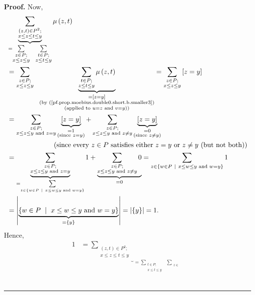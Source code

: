 \documentclass[numbers=enddot,12pt,final,onecolumn,notitlepage]{scrartcl}%
\theoremstyle{definition}
\newenvironment{proof}[1][Proof]{\noindent\textbf{#1.} }{\ \rule{0.5em}{0.5em}}
\newenvironment{vershort}{}{}
\let\sumnonlimits\sum
\renewcommand{\sum}{\sumnonlimits\limits}
\begin{document}
\begin{vershort}
\begin{proof}
Now,%
\begin{align*}
&  \underbrace{\sum_{\substack{\left(  z,t\right)  \in P^{2};\\x\leq z\leq
t\leq y}}}_{=\sum_{\substack{z\in P;\\x\leq z\leq y}}\ \ \sum_{\substack{t\in
P;\\z\leq t\leq y}}}\mu\left(  z,t\right) \\
&  =\sum_{\substack{z\in P;\\x\leq z\leq y}}\ \ \underbrace{\sum
_{\substack{t\in P;\\z\leq t\leq y}}\mu\left(  z,t\right)  }%
_{\substack{=\left[  z=y\right]  \\\text{(by
(\ref{pf.prop.moebius.double0.short.b.smaller3})}\\\text{(applied to
}u=z\text{ and }v=y\text{))}}}=\sum_{\substack{z\in P;\\x\leq z\leq y}}\left[
z=y\right] \\
&  =\sum_{\substack{z\in P;\\x\leq z\leq y\text{ and }z=y}}\underbrace{\left[
z=y\right]  }_{\substack{=1\\\text{(since }z=y\text{)}}}+\sum_{\substack{z\in
P;\\x\leq z\leq y\text{ and }z\neq y}}\underbrace{\left[  z=y\right]
}_{\substack{=0\\\text{(since }z\neq y\text{)}}}\\
&  \ \ \ \ \ \ \ \ \ \ \ \ \ \ \ \ \ \ \ \ \left(  \text{since every }z\in
P\text{ satisfies either }z=y\text{ or }z\neq y\text{ (but not both)}\right)
\\
&  =\underbrace{\sum_{\substack{z\in P;\\x\leq z\leq y\text{ and }z=y}%
}}_{=\sum_{z\in\left\{  w\in P\ \mid\ x\leq w\leq y\text{ and }w=y\right\}  }%
}1+\underbrace{\sum_{\substack{z\in P;\\x\leq z\leq y\text{ and }z\neq y}%
}0}_{=0}=\sum_{z\in\left\{  w\in P\ \mid\ x\leq w\leq y\text{ and
}w=y\right\}  }1\\
&  =\left\vert \underbrace{\left\{  w\in P\ \mid\ x\leq w\leq y\text{ and
}w=y\right\}  }_{=\left\{  y\right\}  }\right\vert =\left\vert \left\{
y\right\}  \right\vert =1.
\end{align*}
Hence,%
\begin{align*}
1  &  =\underbrace{\sum_{\substack{\left(  z,t\right)  \in P^{2};\\x\leq z\leq
t\leq y}}}_{=\sum_{\substack{t\in P;\\x\leq t\leq y}}\ \ \sum_{\substack{z\in
}}}
\end{align*}
\end{proof}
\end{vershort}
\end{document}
